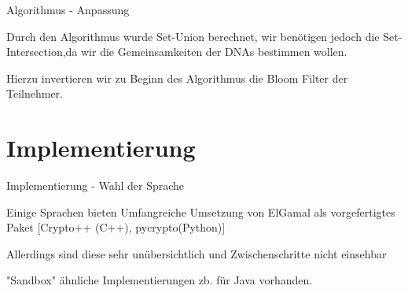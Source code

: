\documentclass{beamer}
\begin{document}
\begin{frame}{Algorithmus - Anpassung} 
	\begin{arrowlist}
\item Durch den Algorithmus wurde Set-Union berechnet, wir benötigen jedoch die Set-Intersection,da wir die Gemeinsamkeiten der DNAs bestimmen wollen.
\item Hierzu invertieren wir zu Beginn des Algorithmus die Bloom Filter der Teilnehmer.
	\end{arrowlist}
\end{frame}

\section{Implementierung}

\begin{frame}{Implementierung - Wahl der Sprache}
	\begin{arrowlist}
		\item Einige Sprachen bieten Umfangreiche Umsetzung von ElGamal als vorgefertigtes Paket [Crypto++ (C++), pycrypto(Python)] 
	    \item Allerdings sind diese sehr unübersichtlich und Zwischenschritte nicht einsehbar 
	    \item "Sandbox" ähnliche Implementierungen zb. für Java vorhanden. 

	\end{arrowlist}
\end{frame}
\end{document}

